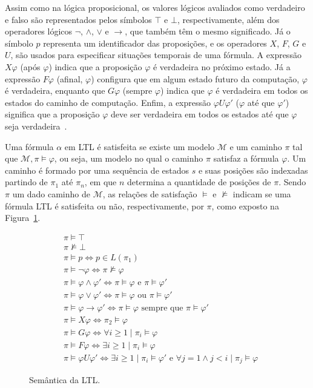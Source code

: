 Assim como na lógica proposicional, os valores lógicos avaliados como verdadeiro e falso são representados pelos símbolos $\top$ e $\bot$, respectivamente, além dos operadores lógicos $\neg$, $\wedge$, $\vee$ e $\rightarrow$, que também têm o mesmo significado. Já o símbolo $p$ representa um identificador das proposições, e os operadores $X$, $F$, $G$ e $U$, são usados para especificar situações temporais de uma fórmula. A expressão $X\varphi$ (após $\varphi$) indica que a proposição $\varphi$ é verdadeira no próximo estado. Já a expressão $F\varphi$ (afinal, $\varphi$) configura que em algum estado futuro da computação, $\varphi$ é verdadeira, enquanto que $G\varphi$ (sempre $\varphi$) indica que $\varphi$ é verdadeira em todos os estados do caminho de computação. Enfim, a expressão $\varphi U \varphi'$ ($\varphi$ até que $\varphi'$) significa que a proposição $\varphi$ deve ser verdadeira em todos os estados até que $\varphi$ seja verdadeira~\cite{mura2016, muller1999invited}. 

Uma fórmula $\alpha$ em LTL é satisfeita se existe um modelo $\mathcal{M}$ e um caminho $\pi$ tal que $\mathcal{M}, \pi \models \varphi$, ou seja, um modelo no qual o caminho $\pi$ satisfaz a fórmula $\varphi$. Um caminho é formado por uma sequência de estados $s$ e suas posições são indexadas partindo de $\pi_{1}$ até $\pi_{n}$, em que $n$ determina a quantidade de posições de $\pi$. Sendo $\pi$ um dado caminho de $\mathcal{M}$, as relações de satisfação $\models$ e $\nvDash$ indicam se uma fórmula LTL é satisfeita ou não, respectivamente, por $\pi$, como exposto na Figura~\ref{fig:ltl_sem}. 

\begin{figure}[ht]
	\caption{Semântica da LTL.} \label{fig:ltl_sem}
	\centering
	\begin{align}
	&\pi \models \top \label{eq:l1} \\
	&\pi \nvDash \bot \label{eq:l2} \\
	&\pi \models p \Longleftrightarrow p \in L(\pi_{1}) \label{eq:l3} \\
	&\pi \models \neg \varphi \iff \pi \not \models \varphi \label{eq:l4} \\
	&\pi \models \varphi \wedge \varphi' \iff \pi \models \varphi \mbox{ e } \pi \models \varphi' \label{eq:l5}\\
	&\pi \models \varphi \vee \varphi' \iff \pi \models \varphi \mbox{ ou } \pi \models \varphi' \label{eq:l6}\\
	&\pi \models \varphi \to \varphi' \iff \pi \models \varphi \mbox{ sempre que } \pi \models \varphi' \label{eq:l7}\\
	&\pi \models X\varphi \iff \pi_2 \models \varphi \label{eq:l8}\\
	&\pi \models G\varphi \iff \forall i \geq 1 \mid \pi_i \models \varphi \label{eq:l9}\\
	&\pi \models F\varphi \iff \exists i \geq 1 \mid \pi_i \models \varphi \label{eq:l10}\\
	&\pi \models \varphi U \varphi' \iff \exists i \geq 1 \mid \pi_i \models \varphi' \mbox{ e } \forall j = 1 \wedge j < i \mid \pi_j \models \varphi \label{eq:l11}
	\end{align}
\end{figure}

